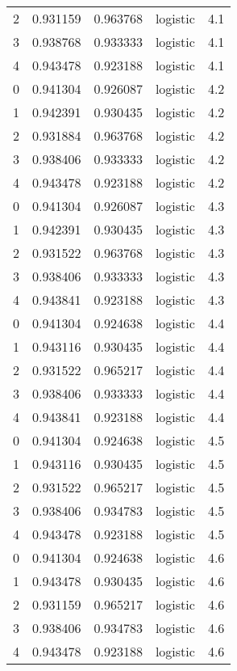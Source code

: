 \begin{tabular}{rrrlr}
     2 & 0.931159 & 0.963768 & logistic &        4.1 \\
     3 & 0.938768 & 0.933333 & logistic &        4.1 \\
     4 & 0.943478 & 0.923188 & logistic &        4.1 \\
     0 & 0.941304 & 0.926087 & logistic &        4.2 \\
     1 & 0.942391 & 0.930435 & logistic &        4.2 \\
     2 & 0.931884 & 0.963768 & logistic &        4.2 \\
     3 & 0.938406 & 0.933333 & logistic &        4.2 \\
     4 & 0.943478 & 0.923188 & logistic &        4.2 \\
     0 & 0.941304 & 0.926087 & logistic &        4.3 \\
     1 & 0.942391 & 0.930435 & logistic &        4.3 \\
     2 & 0.931522 & 0.963768 & logistic &        4.3 \\
     3 & 0.938406 & 0.933333 & logistic &        4.3 \\
     4 & 0.943841 & 0.923188 & logistic &        4.3 \\
     0 & 0.941304 & 0.924638 & logistic &        4.4 \\
     1 & 0.943116 & 0.930435 & logistic &        4.4 \\
     2 & 0.931522 & 0.965217 & logistic &        4.4 \\
     3 & 0.938406 & 0.933333 & logistic &        4.4 \\
     4 & 0.943841 & 0.923188 & logistic &        4.4 \\
     0 & 0.941304 & 0.924638 & logistic &        4.5 \\
     1 & 0.943116 & 0.930435 & logistic &        4.5 \\
     2 & 0.931522 & 0.965217 & logistic &        4.5 \\
     3 & 0.938406 & 0.934783 & logistic &        4.5 \\
     4 & 0.943478 & 0.923188 & logistic &        4.5 \\
     0 & 0.941304 & 0.924638 & logistic &        4.6 \\
     1 & 0.943478 & 0.930435 & logistic &        4.6 \\
     2 & 0.931159 & 0.965217 & logistic &        4.6 \\
     3 & 0.938406 & 0.934783 & logistic &        4.6 \\
     4 & 0.943478 & 0.923188 & logistic &        4.6 \\

\end{tabular}
